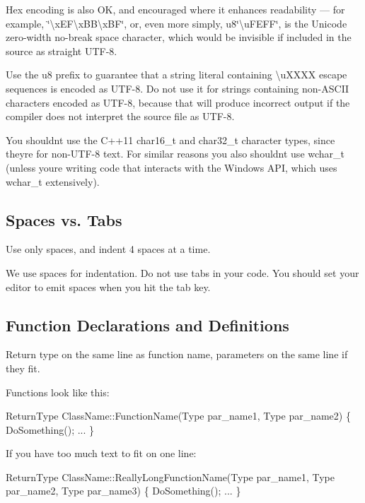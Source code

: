Hex encoding is also OK, and encouraged where it enhances readability — for example, {\ttfamily \char`\"{}\textbackslash{}x\+E\+F\textbackslash{}x\+B\+B\textbackslash{}x\+B\+F\char`\"{}}, or, even more simply, {\ttfamily u8\char`\"{}\textbackslash{}u\+F\+E\+F\+F\char`\"{}}, is the Unicode zero-\/width no-\/break space character, which would be invisible if included in the source as straight U\+T\+F-\/8.

Use the {\ttfamily u8} prefix to guarantee that a string literal containing {\ttfamily \textbackslash{}u\+X\+X\+XX} escape sequences is encoded as U\+T\+F-\/8. Do not use it for strings containing non-\/\+A\+S\+C\+II characters encoded as U\+T\+F-\/8, because that will produce incorrect output if the compiler does not interpret the source file as U\+T\+F-\/8.

You shouldn\textquotesingle{}t use the C++11 {\ttfamily char16\+\_\+t} and {\ttfamily char32\+\_\+t} character types, since they\textquotesingle{}re for non-\/\+U\+T\+F-\/8 text. For similar reasons you also shouldn\textquotesingle{}t use {\ttfamily wchar\+\_\+t} (unless you\textquotesingle{}re writing code that interacts with the Windows A\+PI, which uses {\ttfamily wchar\+\_\+t} extensively).

\subsection*{Spaces vs. Tabs}

Use only spaces, and indent 4 spaces at a time.

We use spaces for indentation. Do not use tabs in your code. You should set your editor to emit spaces when you hit the tab key.

\subsection*{Function Declarations and Definitions}

Return type on the same line as function name, parameters on the same line if they fit.

Functions look like this\+:


\begin{DoxyCode}
ReturnType ClassName::FunctionName(Type par\_name1, Type par\_name2)
\{
    DoSomething();
    ...
\}
\end{DoxyCode}


If you have too much text to fit on one line\+:


\begin{DoxyCode}
ReturnType ClassName::ReallyLongFunctionName(Type par\_name1, Type par\_name2,
                                             Type par\_name3)
\{
    DoSomething();
    ...
\}
\end{DoxyCode}


